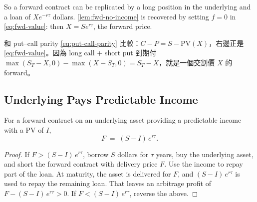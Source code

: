 So a forward contract can be replicated by a long position in the underlying and a loan of $Xe^{-r\tau}$ dollars.
\autoref{lem:fwd-no-income} is recovered by setting $f=0$ in \eqref{eq:fwd-value}: then $X=Se^{r\tau}$, the forward price.

\suppstart
{}

\begin{note}
	和 put--call parity \eqref{eq:put-call-parity} 比較：$C-P=S-\mathrm{PV}(X)$，右邊正是 \eqref{eq:fwd-value}。因為 long call $+$ short put 到期付 $\max(S_{T}-X,0)-\max(X-S_{T},0)=S_{T}-X$，就是一個交割價 $X$ 的 forward。
\end{note}
\suppend

\subsection{Underlying Pays Predictable Income}


\begin{lemma}
	\label{lem:fwd-income}
	For a forward contract on an underlying asset providing a predictable income with a PV of $I$,
	\begin{equation}
		F \;=\; (S-I)\,e^{r\tau} .
		\label{eq:fwd-price-income}
	\end{equation}
\end{lemma}

\begin{proof}
	If $F>(S-I)\,e^{r\tau}$, borrow $S$ dollars for $\tau$ years, buy the underlying asset, and short the forward contract with delivery price $F$.
	Use the income to repay part of the loan.
	At maturity, the asset is delivered for $F$, and $(S-I)\,e^{r\tau}$ is used to repay the remaining loan.
	That leaves an arbitrage profit of $F-(S-I)\,e^{r\tau}>0$.
	If $F<(S-I)\,e^{r\tau}$, reverse the above.
\end{proof}

\suppstart
{}

